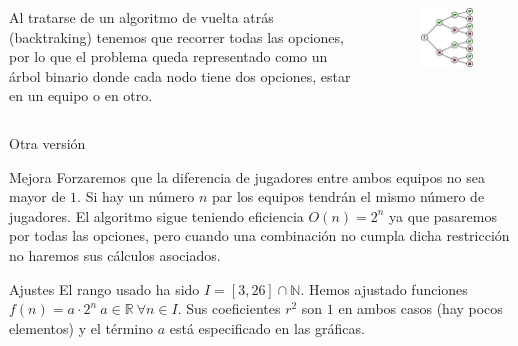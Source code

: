 \begin{frame}
	\begin{columns}
	Al tratarse de un algoritmo de vuelta atrás (backtraking) tenemos que recorrer todas las 
	opciones, por lo que el problema queda representado como un árbol binario donde cada nodo 
	tiene dos opciones, estar en un equipo o en otro.
	
	\begin{figure}[H]
    		\includegraphics[scale=0.65]{./Imagenes/arbolbin.png}
	\end{figure}		
	\end{columns}
\end{frame}


\begin{frame}{Otra versión}
	\begin{block}{Mejora}
	Forzaremos que la diferencia de jugadores entre ambos equipos no sea mayor de $1$. 
	Si hay un número $n$ par los equipos tendrán el mismo número de jugadores. 
	El algoritmo sigue teniendo eficiencia $O(n)=2^n$ ya que pasaremos por todas las opciones, pero
	cuando una combinación no cumpla dicha restricción no haremos sus cálculos asociados.	
	\end{block}

	\begin{alertblock}{Ajustes}
	El rango usado ha sido $I=[3,26]\cap\mathbb{N}$.
	Hemos ajustado funciones $f(n)=a \cdot 2^n\ a\in\mathbb{R}	\ \forall n\in I$. 
	Sus coeficientes $r^2$ son $1$ en ambos casos (hay pocos elementos) y el 	
	término $a$ está especificado en las gráficas.
	\end{alertblock}
\end{frame}


